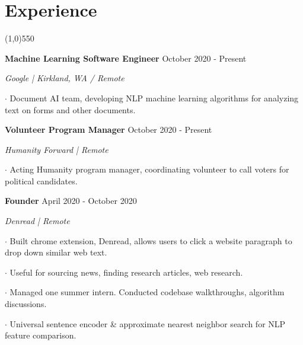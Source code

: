 \documentclass[11pt]{article} %
\begin{document}
	\section*{Experience}
	\vspace{-7ex}
	\begin{center}
    \line(1,0){550}
    \end{center}
    \textbf{\large Machine Learning Software Engineer} \hfill October 2020 - Present
    \setlength{\parindent}{-0ex} \par
    \textit{Google | Kirkland, WA / Remote} \vspace{+2ex} \par
    $\boldsymbol{\cdot}$ Document AI team, developing NLP machine learning algorithms for analyzing text on forms and other documents. \par \vspace{+1ex}
    \vspace{+2ex}
    \textbf{\large Volunteer Program Manager} \hfill October 2020 - Present
    \setlength{\parindent}{-0ex} \par
    \textit{Humanity Forward | Remote} \vspace{+2ex} \par
    $\boldsymbol{\cdot}$ Acting Humanity program manager, coordinating volunteer to call voters for political candidates. \par \vspace{+1ex}
    \vspace{+2ex}
    \textbf{\large Founder} \hfill April 2020 - October 2020
    \setlength{\parindent}{+0ex} \par
    \textit{Denread | Remote} \vspace{+2ex} \par
    $\boldsymbol{\cdot}$ Built chrome extension, Denread, allows users to click a website paragraph to drop down similar web text. \par \vspace{+1ex}
    $\boldsymbol{\cdot}$ Useful for sourcing news, finding research articles, web research. \par \vspace{+1ex}
    $\boldsymbol{\cdot}$ Managed one summer intern. Conducted codebase walkthroughs, algorithm discussions. \par \vspace{+1ex}
    $\boldsymbol{\cdot}$ Universal sentence encoder \& approximate nearest neighbor search for NLP feature comparison.\par \vspace{+1ex}
\end{document}
